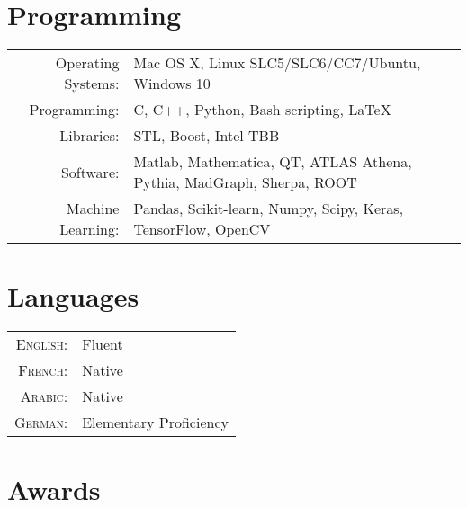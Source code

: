 \documentclass[a4paper,10pt]{article}
\begin{document}
\vspace{3mm}
\section{Programming}
\begin{tabular}{rl}
Operating Systems: 	& Mac OS X, Linux SLC5/SLC6/CC7/Ubuntu, Windows 10 	\\
Programming: 		& C, C++, Python, Bash scripting, \LaTeX				\\
Libraries:          & STL, Boost, Intel TBB \\
Software:           & Matlab, Mathematica, QT, ATLAS Athena, Pythia, MadGraph, Sherpa, ROOT		\\
Machine Learning: 	& Pandas, Scikit-learn, Numpy, Scipy, Keras, TensorFlow, OpenCV 		\\
\end{tabular}

\vspace{3mm}
\section{Languages}

\begin{tabular}{rl}
\textsc{English:}	& Fluent					\\
\textsc{French:}	& Native	\\
\textsc{Arabic:}	& Native    \\
\textsc{German:}	& Elementary Proficiency		\\
\end{tabular}

\vspace{3mm}
\section{Awards}
\end{document}
